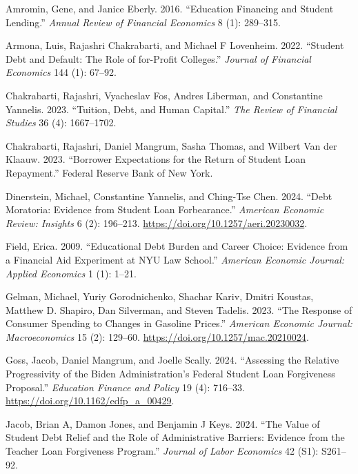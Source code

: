 \documentclass[
  letterpaper,
  DIV=11,
  numbers=noendperiod]{scrartcl}
\newlength{\cslhangindent}
\newenvironment{CSLReferences}[2] %
 {\begin{list}{}{%
  \setlength{\itemindent}{0pt}
  \setlength{\leftmargin}{0pt}
  \setlength{\parsep}{0pt}
  \ifodd #1
   \setlength{\leftmargin}{\cslhangindent}
   \setlength{\itemindent}{-1\cslhangindent}
  \fi
  \setlength{\itemsep}{#2\baselineskip}}}
 {\end{list}}
\begin{document}
\label{refs}
\begin{CSLReferences}{1}{0}
Amromin, Gene, and Janice Eberly. 2016. {``Education Financing and
Student Lending.''} \emph{Annual Review of Financial Economics} 8 (1):
289--315.

Armona, Luis, Rajashri Chakrabarti, and Michael F Lovenheim. 2022.
{``Student Debt and Default: The Role of for-Profit Colleges.''}
\emph{Journal of Financial Economics} 144 (1): 67--92.

Chakrabarti, Rajashri, Vyacheslav Fos, Andres Liberman, and Constantine
Yannelis. 2023. {``Tuition, Debt, and Human Capital.''} \emph{The Review
of Financial Studies} 36 (4): 1667--1702.

Chakrabarti, Rajashri, Daniel Mangrum, Sasha Thomas, and Wilbert Van der
Klaauw. 2023. {``Borrower Expectations for the Return of Student Loan
Repayment.''} Federal Reserve Bank of New York.

Dinerstein, Michael, Constantine Yannelis, and Ching-Tse Chen. 2024.
{``Debt Moratoria: Evidence from Student Loan Forbearance.''}
\emph{American Economic Review: Insights} 6 (2): 196--213.
\url{https://doi.org/10.1257/aeri.20230032}.

Field, Erica. 2009. {``Educational Debt Burden and Career Choice:
Evidence from a Financial Aid Experiment at NYU Law School.''}
\emph{American Economic Journal: Applied Economics} 1 (1): 1--21.

Gelman, Michael, Yuriy Gorodnichenko, Shachar Kariv, Dmitri Koustas,
Matthew D. Shapiro, Dan Silverman, and Steven Tadelis. 2023. {``The
Response of Consumer Spending to Changes in Gasoline Prices.''}
\emph{American Economic Journal: Macroeconomics} 15 (2): 129--60.
\url{https://doi.org/10.1257/mac.20210024}.

Goss, Jacob, Daniel Mangrum, and Joelle Scally. 2024. {``Assessing the
Relative Progressivity of the Biden Administration's Federal Student
Loan Forgiveness Proposal.''} \emph{Education Finance and Policy} 19
(4): 716--33. \url{https://doi.org/10.1162/edfp_a_00429}.

Jacob, Brian A, Damon Jones, and Benjamin J Keys. 2024. {``The Value of
Student Debt Relief and the Role of Administrative Barriers: Evidence
from the Teacher Loan Forgiveness Program.''} \emph{Journal of Labor
Economics} 42 (S1): S261--92.


\end{CSLReferences}
\end{document}

